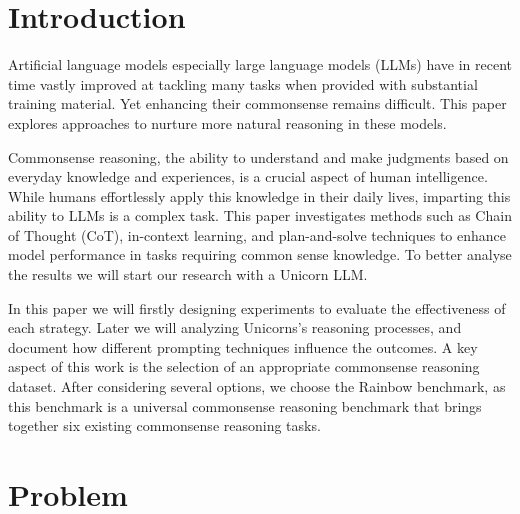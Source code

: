 \documentclass[fleqn,moreauthors,10pt]{ds_report}
\affiliation{\textit{Advisors: Aleš Žagar}}
\begin{document}
\flushbottom 

\maketitle 

\thispagestyle{empty} 


\section*{Introduction}
	Artificial language models especially large language models (LLMs) have in recent time vastly improved at tackling many tasks when provided with substantial training material. Yet enhancing their commonsense remains difficult. This paper explores approaches to nurture more natural reasoning in these models.

    Commonsense reasoning, the ability to understand and make judgments based on everyday knowledge and experiences, is a crucial aspect of human intelligence. While humans effortlessly apply this knowledge in their daily lives, imparting this ability to LLMs is a complex task. This paper investigates methods such as Chain of Thought (CoT), in-context learning, and plan-and-solve techniques to enhance model performance in tasks requiring common sense knowledge. To better analyse the results we will start our research with a Unicorn LLM\cite{Unicorn}. 

    In this paper we will firstly designing experiments to evaluate the effectiveness of each strategy. Later we will analyzing Unicorns’s reasoning processes, and document how different prompting techniques influence the outcomes. A key aspect of this work is the selection of an appropriate commonsense reasoning dataset. After considering several options, we choose the Rainbow \cite{Rainbow} benchmark, as this benchmark is a universal commonsense reasoning benchmark that brings together six existing commonsense reasoning tasks.


\section*{Problem}
\end{document}
